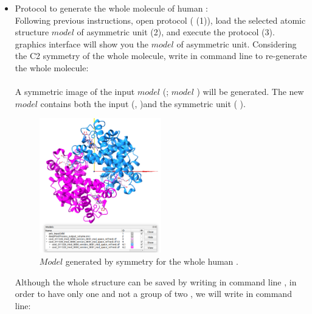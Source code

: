 \begin{itemize}

 \item Protocol  to generate the whole molecule of human :\\
 
 Following previous instructions, open \chimera {} protocol ( (1)), load 
 the selected atomic structure $model$ of  asymmetric unit (2), and execute the protocol (3). \chimera graphics interface will show you the $model$ of  asymmetric unit. Considering the C2 symmetry of the whole molecule, write in \chimera command line to re-generate the whole molecule:\\
 
 \\
 
 A symmetric image of the input $model$ (; $model$ ) will be generated. The new $model$  contains both the input (,  )and the symmetric unit ( ). 
 
 \begin{figure}[H]
    \centering 
    \captionsetup{width=.9\linewidth} 
    \includegraphics[width=0.50\textwidth]{Images/Fig41}
    \caption{$Model$ generated by symmetry for the whole human .}
    \label{fig:chimera_operate_sym}
   \end{figure}
Although the whole structure can be saved by writing in \chimera command line , in order to have only one  and not a group of two , we will write in \chimera command line:\\
 

\end{itemize}
